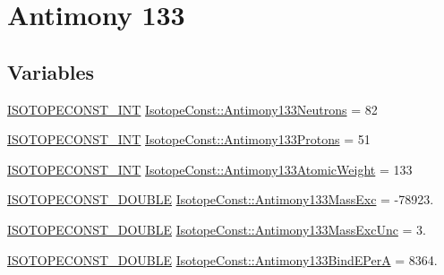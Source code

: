 \hypertarget{group___isotope_const-_antimony-_sb133}{}\section{Antimony 133}
\label{group___isotope_const-_antimony-_sb133}
\subsection*{Variables}
\begin{DoxyCompactItemize}
\item 
\mbox{\hyperlink{group___isotope_const-_macros_ga5f18360b3e99483a35c32d789e62621c}{I\+S\+O\+T\+O\+P\+E\+C\+O\+N\+S\+T\+\_\+\+I\+NT}} \mbox{\hyperlink{group___isotope_const-_antimony-_sb133_gad5859a407364611b8e2424fe0ed0cf7c}{Isotope\+Const\+::\+Antimony133\+Neutrons}} = 82
\item 
\mbox{\hyperlink{group___isotope_const-_macros_ga5f18360b3e99483a35c32d789e62621c}{I\+S\+O\+T\+O\+P\+E\+C\+O\+N\+S\+T\+\_\+\+I\+NT}} \mbox{\hyperlink{group___isotope_const-_antimony-_sb133_gaac8d7d118ec5729eac03574302508134}{Isotope\+Const\+::\+Antimony133\+Protons}} = 51
\item 
\mbox{\hyperlink{group___isotope_const-_macros_ga5f18360b3e99483a35c32d789e62621c}{I\+S\+O\+T\+O\+P\+E\+C\+O\+N\+S\+T\+\_\+\+I\+NT}} \mbox{\hyperlink{group___isotope_const-_antimony-_sb133_gac665d8c6a6a96188f4e2e8cf63cbe897}{Isotope\+Const\+::\+Antimony133\+Atomic\+Weight}} = 133
\item 
\mbox{\hyperlink{group___isotope_const-_macros_ga8f45a7272ce02c0b4c65c44636ed719a}{I\+S\+O\+T\+O\+P\+E\+C\+O\+N\+S\+T\+\_\+\+D\+O\+U\+B\+LE}} \mbox{\hyperlink{group___isotope_const-_antimony-_sb133_ga14c6daf01d76e4b0c6af80e68d995c3e}{Isotope\+Const\+::\+Antimony133\+Mass\+Exc}} = -\/78923.
\item 
\mbox{\hyperlink{group___isotope_const-_macros_ga8f45a7272ce02c0b4c65c44636ed719a}{I\+S\+O\+T\+O\+P\+E\+C\+O\+N\+S\+T\+\_\+\+D\+O\+U\+B\+LE}} \mbox{\hyperlink{group___isotope_const-_antimony-_sb133_ga4c2a8e964d60f28bac35d4775149f337}{Isotope\+Const\+::\+Antimony133\+Mass\+Exc\+Unc}} = 3.
\item 
\mbox{\hyperlink{group___isotope_const-_macros_ga8f45a7272ce02c0b4c65c44636ed719a}{I\+S\+O\+T\+O\+P\+E\+C\+O\+N\+S\+T\+\_\+\+D\+O\+U\+B\+LE}} \mbox{\hyperlink{group___isotope_const-_antimony-_sb133_gab6dc6f4c0eba6b779cbe75ec0766731e}{Isotope\+Const\+::\+Antimony133\+Bind\+E\+PerA}} = 8364.
\item 

\end{DoxyCompactItemize}
